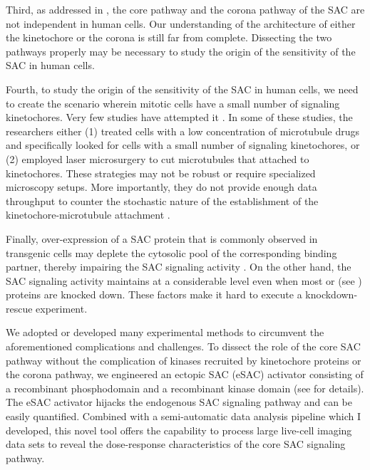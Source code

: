Third, as addressed in , the core pathway and the corona pathway of the SAC are not independent in human cells. Our understanding of the architecture of either the kinetochore or the corona is still far from complete. Dissecting the two pathways properly may be necessary to study the origin of the sensitivity of the SAC in human cells.

Fourth, to study the origin of the sensitivity of the SAC in human cells, we need to create the scenario wherein mitotic cells have a small number of signaling kinetochores. Very few studies have attempted it \cite{RiederNormalProgression, Rheostat, Ablation}. In some of these studies, the researchers either (1) treated cells with a low concentration of microtubule drugs and specifically looked for cells with a small number of signaling kinetochores, or (2) employed laser microsurgery to cut microtubules that attached to kinetochores. These strategies may not be robust or require specialized microscopy setups. More importantly, they do not provide enough data throughput to counter the stochastic nature of the establishment of the kinetochore-microtubule attachment \cite{GradualStochastic}.

Finally, over-expression of a SAC protein that is commonly observed in transgenic cells may deplete the cytosolic pool of the corresponding binding partner, thereby impairing the SAC signaling activity \cite{Bub3Competition, FissionYeastSACRobustness, ATMPhosphorylatesMad1S214, MAD1Overexpression_Ryan2012}. On the other hand, the SAC signaling activity maintains at a considerable level even when most  \cite{Raaijmakers2018, RZZ-MAD1vsBUB1-MAD1_2018, siROD_Zhang2019} or  (see ) proteins are knocked down. These factors make it hard to execute a knockdown-rescue experiment. %

We adopted or developed many experimental methods to circumvent the aforementioned complications and challenges. To dissect the role of the core SAC pathway without the complication of kinases recruited by kinetochore proteins or the corona pathway, we engineered an ectopic SAC (eSAC) activator consisting of a recombinant  phosphodomain and a recombinant  kinase domain (see  for details). The eSAC activator hijacks the endogenous SAC signaling pathway and can be easily quantified. Combined with a semi-automatic data analysis pipeline which I developed, this novel tool offers the capability to process large live-cell imaging data sets to reveal the dose-response characteristics of the core SAC signaling pathway.

